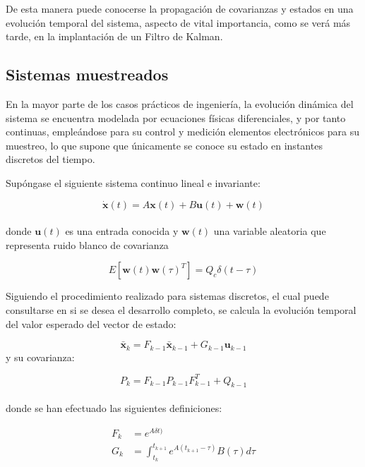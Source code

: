 De esta manera puede conocerse la propagación de covarianzas y estados en una evolución temporal del sistema, aspecto de vital importancia, como se verá más tarde, en la implantación de un Filtro de Kalman. \par 

\subsection{Sistemas muestreados}

En la mayor parte de los casos prácticos de ingeniería, la evolución dinámica del sistema se encuentra modelada por ecuaciones físicas diferenciales, y por tanto continuas, empleándose para su control y medición elementos electrónicos para su muestreo, lo que supone que únicamente se conoce su estado en instantes discretos del tiempo. \par 

\noindent
Supóngase el siguiente sistema continuo lineal e invariante:

\begin{equation}
	\boldsymbol{\dot{x}}(t) = A\boldsymbol{x}(t) + B\boldsymbol{u}(t) + \boldsymbol{w}(t)
\label{eq:eqcontinuo}
\end{equation} \\
\noindent
donde $\boldsymbol{u}(t)$ es una entrada conocida y $\boldsymbol{w}(t)$ una variable aleatoria que representa ruido blanco de covarianza 

\[ E[\boldsymbol{w}(t)\boldsymbol{w}(\tau)^T] = Q_c\delta(t-\tau) \]

Siguiendo el procedimiento realizado para sistemas discretos, el cual puede consultarse en \cite{simon2006optimal} si se desea el desarrollo completo, se calcula la evolución temporal del valor esperado del vector de estado:

\begin{equation}
	\boldsymbol{\bar{x}}_k = F_{k-1}\boldsymbol{\bar{x}}_{k-1} + G_{k-1}\boldsymbol{u}_{k-1}
\end{equation}
\noindent
y su covarianza:

\begin{equation}
	P_k = F_{k-1}P_{k-1}F_{k-1}^T + Q_{k-1}
\end{equation} \\
\noindent
donde se han efectuado las siguientes definiciones: 

\begin{equation}
\begin{split}
	F_k &= e^{A\delta t)} \\
	G_k &= \int_{t_k}^{t_{k+1}} e^{A(t_{k+1} - \tau)}B(\tau)d\tau 
\end{split}
\end{equation}

